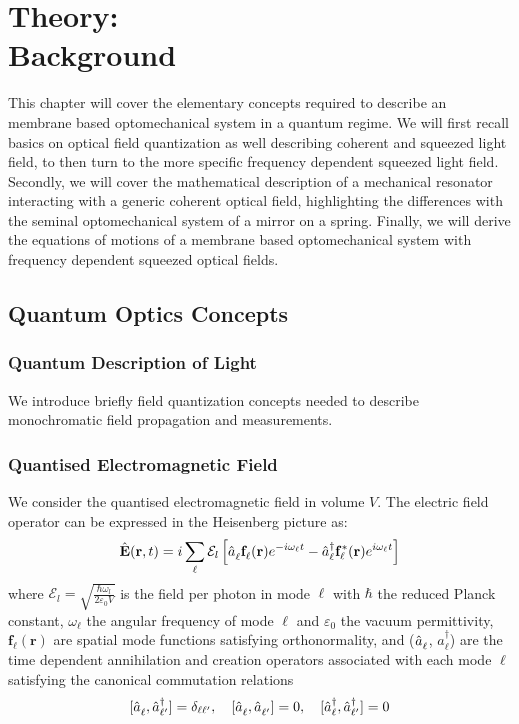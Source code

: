 \newcommand{\adag}[1]{\hat{a}_{#1}^\dagger}
\newcommand{\aop}[1]{\hat{a}_{#1\vphantom{\dagger}}}
\chapter{Theory: \\ Background}
This chapter will cover the elementary concepts required to describe an membrane based optomechanical system in a quantum regime. We will first recall basics on optical field quantization as well describing coherent and squeezed light field, to then turn to the more specific frequency dependent squeezed light field. Secondly, we will cover the mathematical description of a mechanical resonator interacting with a generic coherent optical field, highlighting the differences with the seminal optomechanical system of a mirror on a spring. Finally, we will derive the equations of motions of a membrane based optomechanical system with frequency dependent squeezed optical fields. 
\minitoc
\newpage
\section{Quantum Optics Concepts}
\subsection{Quantum Description of Light}
We introduce briefly field quantization concepts needed to describe monochromatic field propagation and measurements.

\subsection*{Quantised Electromagnetic Field}

We consider the quantised electromagnetic field in volume $V$. The electric field operator can be expressed in the Heisenberg picture as:
\begin{equation}
\hat{\mathbf{E}}(\mathbf{r}, t) = i \sum_{ \ell} \mathcal{E}_l \left[\hat{a}_{\ell}^{\vphantom{dagger}}\mathbf{f}_{\ell}^{\vphantom{*}}(\mathbf{r})e^{-i\omega_{\ell}t} - \hat{a}_{\ell}^\dagger \mathbf{f}_{\ell}^*(\mathbf{r}) e^{i\omega_{\ell}t}\right]
\end{equation}
where $\mathcal{E}_l = \sqrt{\frac{\hbar \omega_l}{2 \varepsilon_0 V}}$ is the field per photon in mode $\ell$ with $\hbar$ the reduced Planck constant, $\omega_\ell$ the angular frequency of mode $\ell$ and $\varepsilon_0$ the vacuum permittivity, $\mathbf{f}_{\ell}(\mathbf{r})$ are spatial mode functions satisfying orthonormality, and ($\hat{a}_{\ell}^{\vphantom{\dagger}}$, $\hat{a}_{\ell}^{\dagger}$) are the time dependent annihilation and creation operators associated with each mode $\ell$ satisfying the canonical commutation relations
\[
[\hat{a}_{\ell}^{\vphantom{\dagger}}, \hat{a}_{\ell'}^\dagger] = \delta_{\ell \ell'} , \quad
[\hat{a}_{\ell}^{\vphantom{\dagger}}, \hat{a}_{\ell'}^{\vphantom{\dagger}} ] = 0, \quad [\hat{a}_{\ell}^\dagger , \hat{a}_{\ell'}^\dagger ] = 0  
\]
